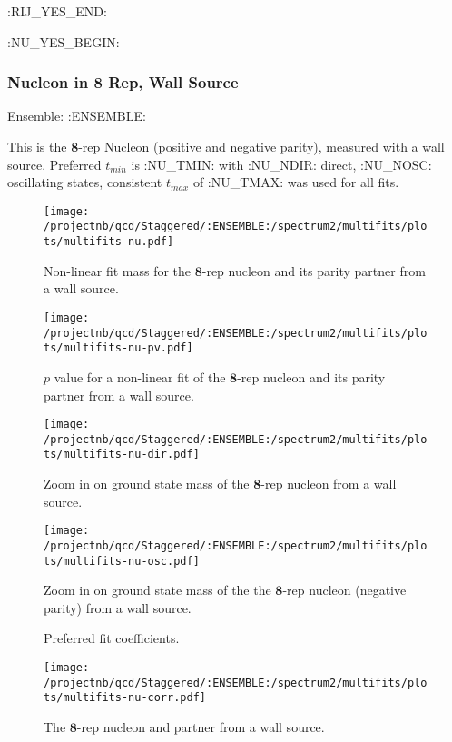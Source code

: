 \clearpage
:RIJ_YES_END:

:NU_YES_BEGIN:
\subsubsection{Nucleon in $\mathbf{8}$ Rep, Wall Source}

Ensemble: :ENSEMBLE:

This is the $\mathbf{8}$-rep Nucleon (positive and negative parity), measured with a wall source. Preferred $t_{min}$ is :NU_TMIN: with :NU_NDIR: direct, :NU_NOSC: oscillating states, consistent $t_{max}$ of :NU_TMAX: was used for all fits.

\begin{multicols}{2}
\begin{figure}[H]
\centering
\texttt{[image: /projectnb/qcd/Staggered/:ENSEMBLE:/spectrum2/multifits/plots/multifits-nu.pdf]}
\caption{Non-linear fit mass for the $\mathbf{8}$-rep nucleon and its parity partner from a wall source.}
\end{figure}
\columnbreak
\begin{figure}[H]
\centering
\texttt{[image: /projectnb/qcd/Staggered/:ENSEMBLE:/spectrum2/multifits/plots/multifits-nu-pv.pdf]}
\caption{$p$ value for a non-linear fit of the $\mathbf{8}$-rep nucleon and its parity partner from a wall source.}
\end{figure}
\end{multicols}

\begin{multicols}{2}
\begin{figure}[H]
\centering
\texttt{[image: /projectnb/qcd/Staggered/:ENSEMBLE:/spectrum2/multifits/plots/multifits-nu-dir.pdf]}
\caption{Zoom in on ground state mass of the $\mathbf{8}$-rep nucleon from a wall source.}
\end{figure}
\columnbreak
\begin{figure}[H]
\centering
\texttt{[image: /projectnb/qcd/Staggered/:ENSEMBLE:/spectrum2/multifits/plots/multifits-nu-osc.pdf]}
\caption{Zoom in on ground state mass of the the $\mathbf{8}$-rep nucleon (negative parity) from a wall source.}
\end{figure}
\end{multicols}

\begin{multicols}{2}
\begin{figure}[H]
\centering
\scriptsize

\caption{Preferred fit coefficients.}
\end{figure}
\columnbreak
\begin{figure}[H]
\centering
\texttt{[image: /projectnb/qcd/Staggered/:ENSEMBLE:/spectrum2/multifits/plots/multifits-nu-corr.pdf]}
\caption{The $\mathbf{8}$-rep nucleon and partner from a wall source.}
\end{figure}
\end{multicols}

